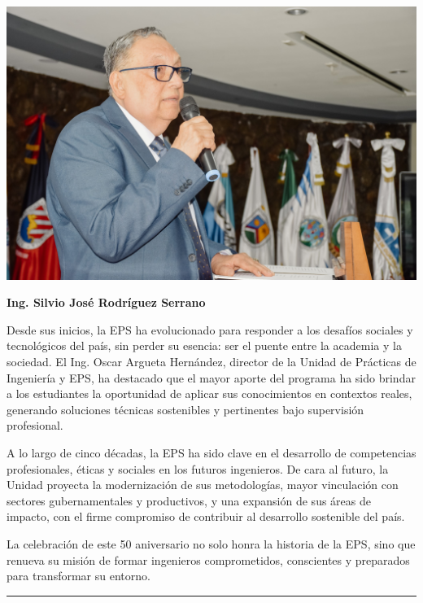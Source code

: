 \documentclass[12pt,spanish,Letterpaper,openany]{book}
\newcommand{\HRule}{\begin{center}\rule{0.5\linewidth}{0.2mm}\end{center}}
\begin{document}
\begin {flushleft}
\noindent\begin{minipage}[c]{\columnwidth}

\begin{center}\includegraphics[width=0.6\linewidth]{imagenes_articulos/art12_01} \end{center}

\textbf{Ing. Silvio José Rodríguez Serrano}

\end{minipage}
\end {flushleft}

Desde sus inicios, la EPS ha evolucionado para responder a los desafíos sociales y tecnológicos del país, sin perder su esencia: ser el puente entre la academia y la sociedad. El Ing. Oscar Argueta Hernández, director de la Unidad de Prácticas de Ingeniería y EPS, ha destacado que el mayor aporte del programa ha sido brindar a los estudiantes la oportunidad de aplicar sus conocimientos en contextos reales, generando soluciones técnicas sostenibles y pertinentes bajo supervisión profesional.

A lo largo de cinco décadas, la EPS ha sido clave en el desarrollo de competencias profesionales, éticas y sociales en los futuros ingenieros. De cara al futuro, la Unidad proyecta la modernización de sus metodologías, mayor vinculación con sectores gubernamentales y productivos, y una expansión de sus áreas de impacto, con el firme compromiso de contribuir al desarrollo sostenible del país.

La celebración de este 50 aniversario no solo honra la historia de la EPS, sino que renueva su misión de formar ingenieros comprometidos, conscientes y preparados para transformar su entorno.

\medskip

\HRule

\medskip







\end{document}
